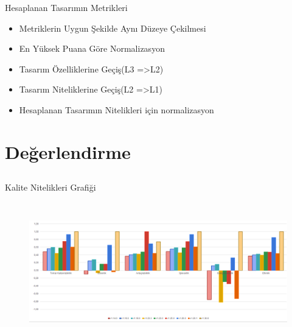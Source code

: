 \documentclass[compress,xcolor=table]{beamer}
\begin{document}
        
        
        
        
        
        
        \begin{frame}{Hesaplanan Tasarımın Metrikleri}
\begin{block}{ }
		
\begin{itemize}
\item Metriklerin Uygun Şekilde Aynı Düzeye Çekilmesi
\item En Yüksek Puana Göre Normalizasyon
\item Tasarım Özelliklerine Geçiş(L3 =>L2)
\item Tasarım Niteliklerine Geçiş(L2 =>L1)
\item Hesaplanan Tasarımın Nitelikleri için normalizasyon



\end{itemize}

		
\end{block}
\end{frame}
        

        
\section{Değerlendirme} \subsection{}



\begin{frame}{Kalite Nitelikleri Grafiği}
\begin{figure}

\vspace{-.8cm}
   \includegraphics[width = \textwidth, height =6cm]{QMOODimage/grafik 1.png}
\end{figure}
\vspace{-1cm}
\begin{itemize}
   
\end{itemize}
\end{frame}
\end{document}
